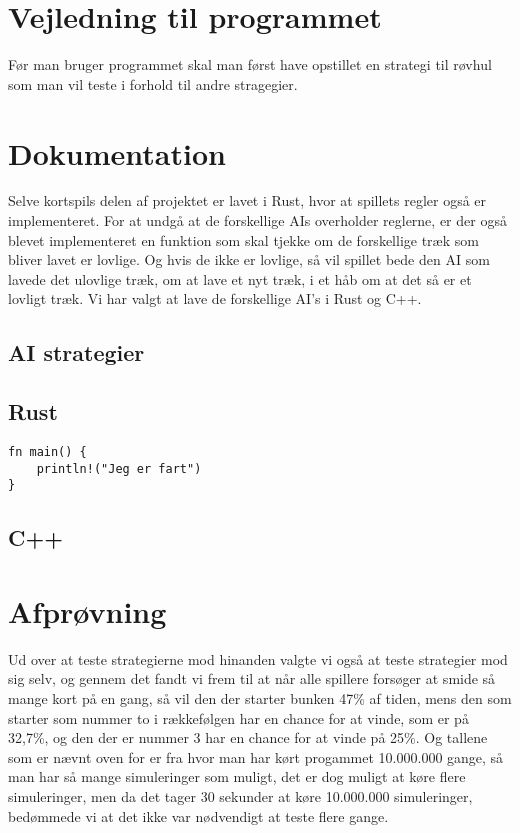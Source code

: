 \documentclass[a4paper, 12pt]{article}
\begin{document}
\section{Vejledning til programmet}

Før man bruger programmet skal man først have opstillet en strategi til røvhul som man vil teste i forhold til andre stragegier. 



\vfill
\pagebreak

\section{Dokumentation}

Selve kortspils delen af projektet er lavet i Rust, hvor at spillets regler også er implementeret. For at undgå at de forskellige AIs overholder reglerne, er der også blevet implementeret en funktion som skal tjekke om de forskellige træk som bliver lavet er lovlige. Og hvis de ikke er lovlige, så vil spillet bede den AI som lavede det ulovlige træk, om at lave et nyt træk, i et håb om at det så er et lovligt træk. Vi har valgt at lave de forskellige AI's i Rust og C++.

\subsection{AI strategier}







\vfill
\pagebreak


\subsection{Rust}


\begin{verbatim}
fn main() {
	println!("Jeg er fart")
}
\end{verbatim}


\subsection{C++}



\vfill
\pagebreak

\section{Afprøvning}
Ud over at teste strategierne mod hinanden valgte vi også at teste strategier mod sig selv, og gennem det fandt vi frem til at når alle spillere forsøger at smide så mange kort på en gang, så vil den der starter bunken 47\% af tiden, mens den som starter som nummer to i rækkefølgen har en chance for at vinde, som er på 32,7\%, og den der er nummer 3 har en chance for at vinde på 25\%. 
Og tallene som er nævnt oven for er fra hvor man har kørt progammet 10.000.000 gange, så man har så mange simuleringer som muligt, det er dog muligt at køre flere simuleringer, men da det tager 30 sekunder at køre 10.000.000 simuleringer, bedømmede vi at det ikke var nødvendigt at teste flere gange.
\end{document}
